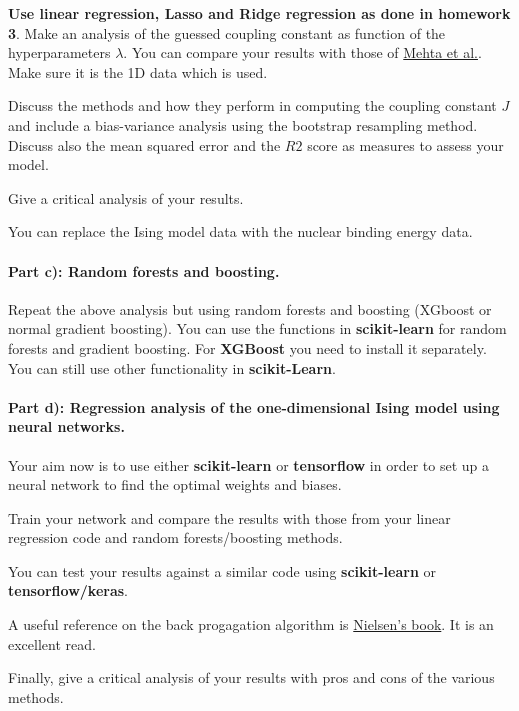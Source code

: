 \documentclass[%
oneside,                 %
final,                   %
10pt]{article}
\begin{document}
\textbf{Use linear regression,
Lasso and Ridge regression as done in homework 3}.
Make an analysis of the guessed coupling constant as function of the hyperparameters $\lambda$. 
You can compare your
results with those of \href{{https://physics.bu.edu/~pankajm/ML-Notebooks/HTML/NB_CVI-linreg_ising.html}}{Mehta
et al.}.
Make sure it is the 1D data which is used.

Discuss the methods and how they perform in computing the coupling
constant $J$ and include a bias-variance analysis using the bootstrap resampling method.
Discuss also the mean squared error and
the $R2$ score as measures to assess your model.

Give a critical analysis of your results.


You can replace the Ising model data with the nuclear binding energy data.



\paragraph{Part c): Random forests and boosting.}
Repeat the above analysis but using random forests and boosting (XGboost or normal gradient boosting). You can use the functions
in \textbf{scikit-learn} for random forests and gradient boosting. For \textbf{XGBoost} you need to install it separately. You can still use other functionality in \textbf{scikit-Learn}. 

\paragraph{Part d): Regression analysis of the one-dimensional Ising model using neural networks.}
Your aim now is to use either \textbf{scikit-learn} or \textbf{tensorflow} in order to set up a neural network to find the optimal weights and biases. 

Train your network and compare the results with those from your linear regression code and random forests/boosting methods. 

You can test your results against a similar code using \textbf{scikit-learn} or \textbf{tensorflow/keras}. 


A useful reference on the back progagation algorithm is \href{{http://neuralnetworksanddeeplearning.com/}}{Nielsen's book}. It is an excellent read.


Finally, give a critical analysis of your results with pros and cons of the various methods. 
\end{document}
